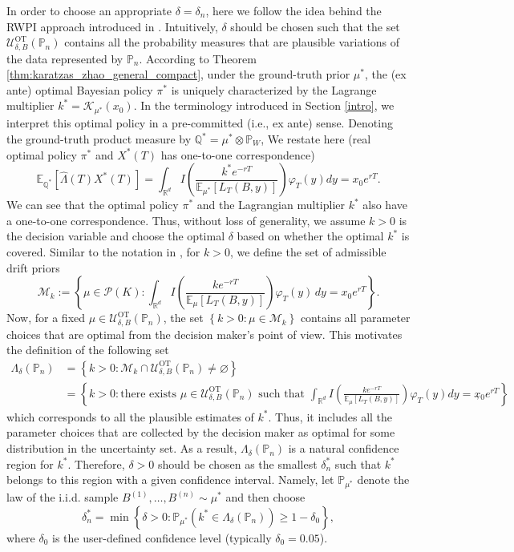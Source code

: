 \documentclass[11pt]{article}
\theoremstyle{definition}
\begin{document}
In order to choose an appropriate $\delta = \delta_n$, here we follow the idea behind the RWPI approach introduced in \cite{BKW19}. Intuitively, $\delta$ should be chosen such that the set $\mathcal U^{\text{OT}}_{\delta,B}(\mathbb P_n)$ contains all the probability measures that are plausible variations of the data represented by $\mathbb P_n$. 
{According to Theorem \ref{thm:karatzas_zhao_general_compact}, under the ground-truth prior $\mu^*$, the (ex ante) optimal Bayesian policy $\pi^*$ is uniquely characterized by the Lagrange multiplier $k^*=\mathcal{K}_{\mu^*}(x_0)$. In the terminology introduced in Section \ref{intro}, we interpret this optimal policy in a pre-committed (i.e., ex ante) sense. %
Denoting the ground-truth product measure by $\mathbb{Q}^* = \mu^* \otimes \mathbb{P}_W$,} We restate here (real optimal policy $\pi^*$ and $X^*(T)$ has one-to-one correspondence)
$$
 \mathbb{E}_{\mathbb{Q}^*}\left[\hat{\Lambda}(T)X^*(T)\right] =  \int_{\mathbb{R}^d }I\left(\frac{k^*e^{-rT}}{\mathbb{E}_{\mu^*}\left[L_T(B,y)\right]}\right)\varphi_T(y)dy = x_0e^{rT}. %
$$
We can see that the optimal policy $\pi^*$ and the Lagrangian multiplier $k^*$ also have a one-to-one correspondence. Thus, without loss of generality, we assume $k > 0$ is the decision variable and choose the optimal $\delta$ based on whether the optimal $k^*$ is covered. Similar to the notation in \cite{BKW19}, 
{for \(k>0\), we define the set of admissible drift priors
\[
\mathcal M_k
:=
\left\{
\mu \in\mathcal P(K):
\int_{\mathbb R^d}
I\left(
\frac{k e^{-rT}}{\mathbb{E}_\mu[L_T(B,y)]}
\right)\varphi_T(y)\,dy
=
x_0e^{rT}
\right\}.
\]}
{
Now, for a fixed $\mu \in \mathcal{U}^{\text{OT}}_{\delta,B}(\mathbb P_n)$, the set $\left\{k > 0: 
\mu \in \mathcal{M}_k\right\}$ contains all parameter choices that are optimal from the decision maker's point of view. This motivates the definition of the following set
\begin{align*}
\Lambda_{\delta}(\mathbb P_n) &= \left\{k > 0: \mathcal{M}_k \cap \mathcal{U}^{\text{OT}}_{\delta,B}(\mathbb P_n) \neq \varnothing \right\}\\
&=\left\{k > 0: \text{there exists } \mu \in \mathcal{U}^{\text{OT}}_{\delta,B}(\mathbb P_n) \text{ such that }\int_{\mathbb{R}^d }I\left(\frac{ke^{-rT}}{\mathbb{E}_{\mu}\left[L_T(B,y)\right]}\right)\varphi_T(y)dy = x_0e^{rT} \right\},   
\end{align*}
}
which corresponds to all the plausible estimates of $k^*$. Thus, it includes all the parameter choices that are collected by the decision maker as optimal for some distribution in the uncertainty set. As a result, $\Lambda_{\delta}(\mathbb P_n)$ is a natural confidence region for $k^*$. Therefore, $\delta > 0$ should be chosen as the smallest $\delta^*_n$ such that $k^*$ belongs to this region with a given confidence interval. Namely, {let \(\mathbb P_{\mu^*}\) denote the law of the i.i.d. sample
\(B^{(1)},\ldots,B^{(n)}\sim\mu^*\) and then choose
\[
\delta_n^*
=
\min\left\{
\delta>0:
\mathbb P_{\mu^*}(k^*\in\Lambda_\delta(\mathbb P_n))\ge 1-\delta_0
\right\},
\]} 
where %
$\delta_0$ is the user-defined confidence level (typically $\delta_0 = 0.05$).
\end{document}
